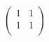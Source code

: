 \documentclass[11pt]{article}
\begin{document}
    $
    \begin{pmatrix}
        1 & 1\\
        1 & 1\\
    \end{pmatrix}
    $
\end{document}
